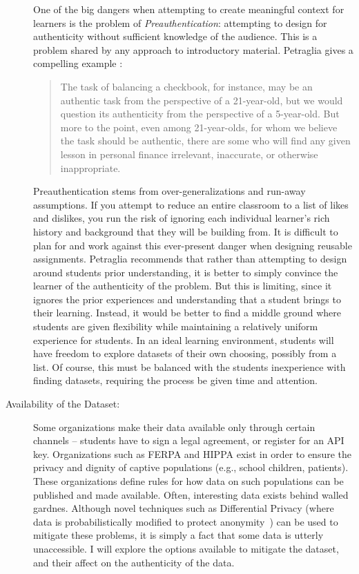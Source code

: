 \begin{description}
One of the big dangers when attempting to create meaningful context for learners is the problem of \textit{Preauthentication}: attempting to design for authenticity without sufficient knowledge of the audience. This is a problem shared by any approach to introductory material. Petraglia gives a compelling example \cite{preauthentication}:
	
\begin{quotation}
    The task of balancing a checkbook, for instance, may be an authentic task from the perspective of a 21-year-old, but we would question its authenticity from the perspective of a 5-year-old. But more to the point, even among 21-year-olds, for whom we believe the task should be authentic, there are some who will find any given lesson in personal finance irrelevant, inaccurate, or otherwise inappropriate. 
\end{quotation}
Preauthentication stems from over-generalizations and run-away assumptions.
If you attempt to reduce an entire classroom to a list of likes and dislikes, you run the risk of ignoring each individual learner's rich history and background that they will be building from. 
It is difficult to plan for and work against this ever-present danger when designing reusable assignments. 
Petraglia \cite{preauthentication} recommends that rather than attempting to design around students prior understanding, it is better to simply convince the learner of the authenticity of the problem.
But this is limiting, since it ignores the prior experiences and understanding that a student brings to their learning.
Instead, it would be better to find a middle ground where students are given flexibility while maintaining a relatively uniform experience for students.
In an ideal learning environment, students will have freedom to explore datasets of their own choosing, possibly from a list.
Of course, this must be balanced with the students inexperience with finding datasets, requiring the process be given time and attention.
	
	\item[Availability of the Dataset:] Some organizations make their data available only through certain channels -- students have to sign a legal agreement, or register for an API key. Organizations such as FERPA and HIPPA exist in order to ensure the privacy and dignity of captive populations (e.g., school children, patients). These organizations define rules for how data on such populations can be published and made available. Often, interesting data exists behind walled gardnes. Although novel techniques such as Differential Privacy (where data is probabilistically modified to protect anonymity~\cite{dwork2011differential}) can be used to mitigate these problems, it is simply a fact that some data is utterly unaccessible. I will explore the options available to mitigate the dataset, and their affect on the authenticity of the data.
	

\end{description}
